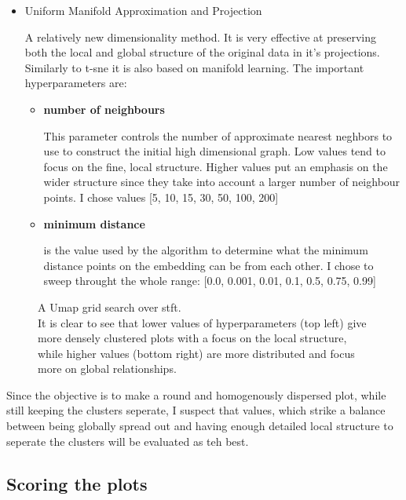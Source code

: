 \documentclass[11pt]{article}
\begin{document}
\begin{itemize}
\item Uniform Manifold Approximation and Projection

A relatively new dimensionality method. It is very effective at preserving both the local and global structure of the original data in it's projections. Similarly to t-sne it is also based on manifold learning. The important hyperparameters are:
\begin{itemize}
\item \textbf{ number of neighbours }

This parameter controls the number of approximate nearest neghbors to use to construct the initial high dimensional graph. Low values tend to focus on the fine, local structure. Higher values put an emphasis on the wider structure since they take into account a larger number of neighbour points. I chose values [5, 10, 15, 30, 50, 100, 200]

  \item \textbf{ minimum distance }

is the value used by the algorithm to determine what the minimum distance points on the embedding can be from each other. I chose to sweep throught the whole range: [0.0, 0.001, 0.01, 0.1, 0.5, 0.75, 0.99]
\end{itemize}
\end{itemize}

\begin{figure}[h!tbp]
\centering
{}
\caption{A Umap grid search over stft.\\ It is clear to see that lower values of hyperparameters (top left) give more densely clustered plots with a focus on the local structure, while higher values (bottom right) are more distributed and focus more on global relationships.}
\end{figure}

Since the objective is to make a round and homogenously dispersed plot, while still keeping the clusters seperate, I suspect that values, which strike a balance between being globally spread out and having enough detailed local structure to seperate the clusters will be evaluated as teh best.

\subsection{Scoring the plots}
\label{sec:org007743d}
\end{document}
